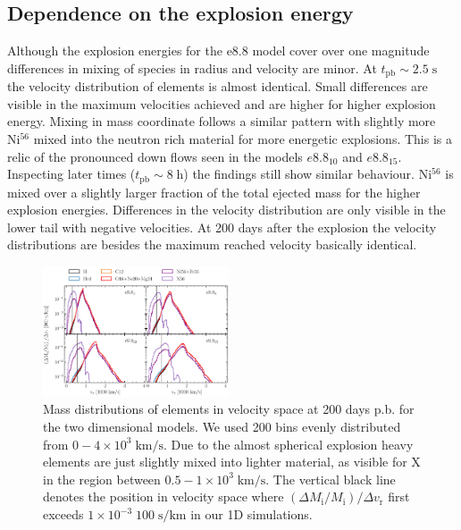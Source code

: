\documentclass[fleqn,usenatbib]{mnras}
\newcommand{\nickel}{$\mathrm{Ni^{56}}$\xspace}
\newcommand{\tracer}{$\mathrm{X}$\xspace}
\begin{document}
\subsection{Dependence on the explosion energy}
\label{subsec:Dependence on the explosion energy}
Although the explosion energies for the e8.8 model cover over one magnitude differences in mixing of species in radius and velocity are minor. At $t_{\mathrm{pb}}\sim 2.5 \;\mathrm{s}$ the velocity distribution of elements is almost identical. Small differences are visible in the maximum velocities achieved and are higher for higher explosion energy. Mixing in mass coordinate follows a similar pattern with slightly more \nickel mixed into the neutron rich material for more energetic explosions. This is a relic of the pronounced down flows seen in the models $e8.8_{10}$ and $e8.8_{15}$. 
Inspecting later times ($t_{\mathrm{pb}}\sim 8 \;\mathrm{h}$) the findings still show similar behaviour. \nickel is mixed over a slightly larger fraction of the total ejected mass for the higher explosion energies. Differences in the velocity distribution are only visible in the lower tail with negative velocities. 
At 200 days after the explosion the velocity distributions are besides the maximum reached velocity basically identical.
\begin{figure}
 \label{fig:e8_massDis_32d}
 \centering
 \includegraphics[width=0.49\textwidth]{pic/massDis_mvr_all_time_200d.pdf}
 \caption{Mass distributions of elements in velocity space at 200 days p.b. for the two dimensional models. We used 200 bins evenly distributed from  $0-4\times 10^3\;\mathrm{km/s}$. Due to the almost spherical explosion heavy elements are just slightly mixed into lighter material, as visible for \tracer in the region between $0.5-1\times 10^3\;\mathrm{km/s}$. The vertical black line denotes the position in velocity space where $(\Delta M_{\mathrm{i}}/M_{\mathrm{i}})/\Delta v_{\mathrm{r}}$ first exceeds $1\times 10^{-3}\;\mathrm{100\;s/km}$ in our 1D simulations.}
\end{figure}
\end{document}
